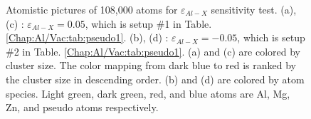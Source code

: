 \begin{figure}[!ht]
\caption[Atomistic pictures of 108,000 atoms for $\varepsilon_{Al-X}$ sensitivity test.]{Atomistic pictures of 108,000 atoms for $\varepsilon_{Al-X}$ sensitivity test. (a), (c) : $\varepsilon_{Al-X} = 0.05$, which is setup \#1 in Table. \ref{Chap:Al/Vac:tab:pseudo1}. (b), (d) : $\varepsilon_{Al-X} = -0.05$, which is setup \#2 in Table. \ref{Chap:Al/Vac:tab:pseudo1}. (a) and (c) are colored by cluster size. The color mapping from dark blue to red is ranked by the cluster size in descending order. (b) and (d) are colored by atom species. Light green, dark green, red, and blue atoms are Al, Mg, Zn, and pseudo atoms respectively.}
\label{Chap:Al/Vac:fig:sens_Al}
\end{figure}
\endgroup


